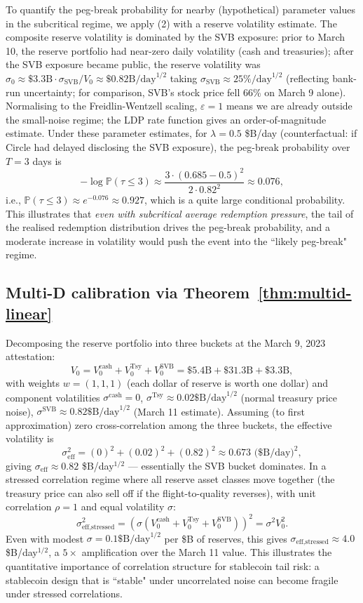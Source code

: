 \documentclass[11pt,a4paper]{article}
\theoremstyle{plain}
\theoremstyle{definition}
\renewcommand{\P}{\mathbb{P}}
\newcommand{\eps}{\varepsilon}
\begin{document}
To quantify the peg-break probability for nearby (hypothetical) parameter values in the subcritical regime, we apply (2) with a reserve volatility estimate.
The composite reserve volatility is dominated by the SVB exposure: prior to March 10, the reserve portfolio had near-zero daily volatility (cash and treasuries); after the SVB exposure became public, the reserve volatility was $\sigma_0 \approx \$3.3\text{B}\cdot\sigma_{\text{SVB}}/V_0 \approx \$0.82\text{B}/\text{day}^{1/2}$ taking $\sigma_{\text{SVB}} \approx 25\%/\text{day}^{1/2}$ (reflecting bank-run uncertainty; for comparison, SVB's stock price fell 66\% on March 9 alone).
Normalising to the Freidlin-Wentzell scaling, $\eps = 1$ means we are already outside the small-noise regime; the LDP rate function gives an order-of-magnitude estimate.
Under these parameter estimates, for $\lambda = 0.5$ \$B/day (counterfactual: if Circle had delayed disclosing the SVB exposure), the peg-break probability over $T = 3$ days is
$$-\log\P(\tau \leq 3) \approx \frac{3\cdot (0.685 - 0.5)^2}{2\cdot 0.82^2} \approx 0.076,$$
i.e., $\P(\tau \leq 3) \approx e^{-0.076} \approx 0.927$, which is a quite large conditional probability.
This illustrates that \emph{even with subcritical average redemption pressure}, the tail of the realised redemption distribution drives the peg-break probability, and a moderate increase in volatility would push the event into the ``likely peg-break" regime.

\subsection{Multi-D calibration via Theorem~\ref{thm:multid-linear}}

Decomposing the reserve portfolio into three buckets at the March 9, 2023 attestation:
$$V_0 = V^{\text{cash}}_0 + V^{\text{Tsy}}_0 + V^{\text{SVB}}_0 = \$5.4\text{B} + \$31.3\text{B} + \$3.3\text{B},$$
with weights $w = (1, 1, 1)$ (each dollar of reserve is worth one dollar) and component volatilities $\sigma^{\text{cash}} = 0$, $\sigma^{\text{Tsy}} \approx 0.02 \text{\$B/day}^{1/2}$ (normal treasury price noise), $\sigma^{\text{SVB}} \approx 0.82 \text{\$B/day}^{1/2}$ (March 11 estimate). Assuming (to first approximation) zero cross-correlation among the three buckets, the effective volatility is
$$\sigma_{\text{eff}}^2 = (0)^2 + (0.02)^2 + (0.82)^2 \approx 0.673 \text{ (\$B/day)}^2,$$
giving $\sigma_{\text{eff}} \approx 0.82$ \$B/day$^{1/2}$ --- essentially the SVB bucket dominates. In a stressed correlation regime where all reserve asset classes move together (the treasury price can also sell off if the flight-to-quality reverses), with unit correlation $\rho = 1$ and equal volatility $\sigma$:
$$\sigma_{\text{eff,stressed}}^2 = (\sigma(V^{\text{cash}}_0 + V^{\text{Tsy}}_0 + V^{\text{SVB}}_0))^2 = \sigma^2 V_0^2.$$
Even with modest $\sigma = 0.1\text{\$B/day}^{1/2}$ per \$B of reserves, this gives $\sigma_{\text{eff,stressed}} \approx 4.0$ \$B/day$^{1/2}$, a $5\times$ amplification over the March 11 value. This illustrates the quantitative importance of correlation structure for stablecoin tail risk: a stablecoin design that is ``stable" under uncorrelated noise can become fragile under stressed correlations.
\end{document}
